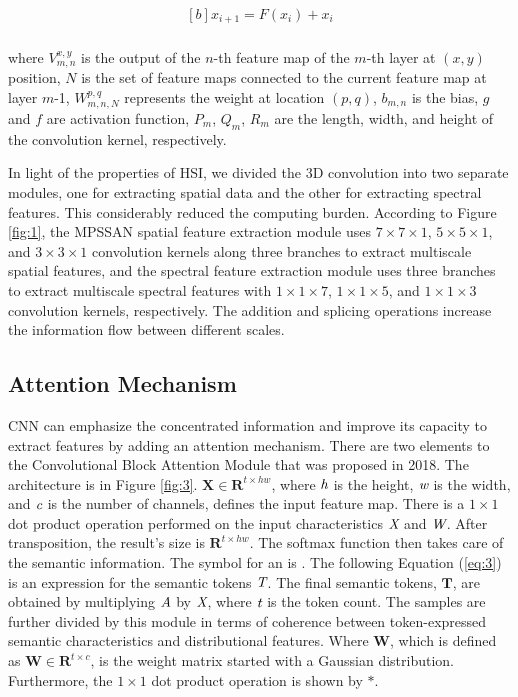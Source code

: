 \documentclass[]{interact}
\theoremstyle{plain}%
\theoremstyle{definition}
\theoremstyle{remark}
\begin{document}
\begin{equation}\label{eq:2}
\begin{aligned}[b]
x_{i+1}=F\left(x_{i}\right)+x_{i} \\
\end{aligned}
\end{equation}


where $V_{m, n}^{x, y}$ is the output of the $n$-th feature map of the $m$-th layer at $(x, y)$ position, $N$ is the set of feature maps connected to the current feature map at layer $m$-1, $W_{m, n, N}^{p, q}$ represents the weight at location $(p,q)$, $b_{m, n}$ is the bias, $g$ and $f$ are activation function, $P_{m}$, $Q_{m}$, $R_{m}$ are the length, width, and height of the convolution kernel, respectively.

In light of the properties of HSI, we divided the 3D convolution into two separate modules, one for extracting spatial data and the other for extracting spectral features. This considerably reduced the computing burden. According to Figure \ref{fig:1}, the MPSSAN spatial feature extraction module uses $7 \times7 \times 1$, $5 \times 5 \times 1$, and $3 \times 3 \times 1$ convolution kernels along three branches to extract multiscale spatial features, and the spectral feature extraction module uses three branches to extract multiscale spectral features with $1 \times 1 \times 7$, $1 \times 1 \times 5$, and $1 \times 1 \times 3$ convolution kernels, respectively. The addition and splicing operations increase the information flow between different scales. 
\subsection{Attention Mechanism}

CNN can emphasize the concentrated information and improve its capacity to extract features by adding an attention mechanism. There are two elements to the Convolutional Block Attention Module \citep{woo2018cbam} that was proposed in 2018. The architecture is in Figure \ref{fig:3}. ${\boldsymbol X} \in {\boldsymbol R}^{t\times hw}$, where $\emph{h}$  is the height, $\emph{w}$ is the width, and $\emph{c}$ is the number of channels, defines the input feature map. There is a $1 \times 1$ dot product operation performed on the input characteristics $\emph{X}$ and $\emph{W}$. After transposition, the result's size is ${\boldsymbol R}^{t\times hw}$. The softmax function then takes care of the semantic information. The symbol for an is . The following Equation (\ref{eq:3}) is an expression for the semantic tokens $\emph{T}$. The final semantic tokens, ${\boldsymbol T}$, are obtained by multiplying $\emph{A}$ by $\emph{X}$, where $\emph{t}$ is the token count. The samples are further divided by this module in terms of coherence between token-expressed semantic characteristics and distributional features. Where ${\boldsymbol W}$, which is defined as ${\boldsymbol W} \in {\boldsymbol R}^{t\times c}$, is the weight matrix started with a Gaussian distribution. Furthermore, the $1 \times 1$ dot product operation is shown by $*$.
\end{document}
